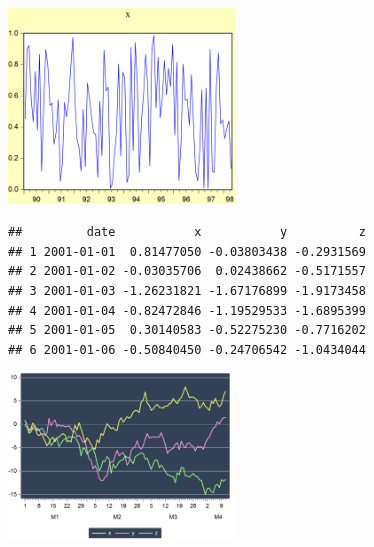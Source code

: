 \documentclass[
]{article}
\begin{document}
\begin{center}\includegraphics[width=0.45\textwidth]{test_engEviews_files/figure-latex//eview-graph-x} \end{center}

\begin{verbatim}
##         date           x           y          z
## 1 2001-01-01  0.81477050 -0.03803438 -0.2931569
## 2 2001-01-02 -0.03035706  0.02438662 -0.5171557
## 3 2001-01-03 -1.26231821 -1.67176899 -1.9173458
## 4 2001-01-04 -0.82472846 -1.19529533 -1.6895399
## 5 2001-01-05  0.30140583 -0.52275230 -0.7716202
## 6 2001-01-06 -0.50840450 -0.24706542 -1.0434044
\end{verbatim}

\begin{center}\includegraphics[width=0.45\textwidth]{test_engEviews_files/figure-latex//rwalk-xyz} \end{center}
\end{document}
